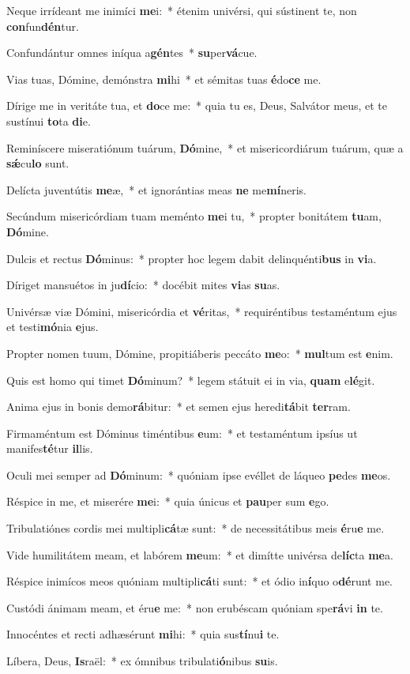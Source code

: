 \item Neque irrídeant me inimíci \textbf{me}i:~* étenim univérsi, qui sústinent te, non \textbf{con}fun\textbf{dén}tur.
\item Confundántur omnes iníqua a\textbf{gén}tes~* \textbf{su}per\textbf{vá}cue.
\item Vias tuas, Dómine, demónstra \textbf{mi}hi~* et sémitas tuas \textbf{é}do\textbf{ce} me.
\item Dírige me in veritáte tua, et \textbf{do}ce me:~* quia tu es, Deus, Salvátor meus, et te sustínui \textbf{to}ta \textbf{di}e.
\item Reminíscere miseratiónum tuárum, \textbf{Dó}mine,~* et misericordiárum tuárum, quæ a \textbf{sǽ}cu\textbf{lo} sunt.
\item Delícta juventútis \textbf{me}æ,~* et ignorántias meas \textbf{ne} me\textbf{mí}neris.
\item Secúndum misericórdiam tuam meménto \textbf{me}i tu,~* propter bonitátem \textbf{tu}am, \textbf{Dó}mine.
\item Dulcis et rectus \textbf{Dó}minus:~* propter hoc legem dabit delinquénti\textbf{bus} in \textbf{vi}a.
\item Díriget mansuétos in ju\textbf{dí}cio:~* docébit mites \textbf{vi}as \textbf{su}as.
\item Univérsæ viæ Dómini, misericórdia et \textbf{vé}ritas,~* requiréntibus testaméntum ejus et testi\textbf{mó}nia \textbf{e}jus.
\item Propter nomen tuum, Dómine, propitiáberis peccáto \textbf{me}o:~* \textbf{mul}tum est \textbf{e}nim.
\item Quis est homo qui timet \textbf{Dó}minum?~* legem státuit ei in via, \textbf{quam} e\textbf{lé}git.
\item Anima ejus in bonis demo\textbf{rá}bitur:~* et semen ejus heredi\textbf{tá}bit \textbf{ter}ram.
\item Firmaméntum est Dóminus timéntibus \textbf{e}um:~* et testaméntum ipsíus ut manifes\textbf{té}tur \textbf{il}lis.
\item Oculi mei semper ad \textbf{Dó}minum:~* quóniam ipse evéllet de láqueo \textbf{pe}des \textbf{me}os.
\item Réspice in me, et miserére \textbf{me}i:~* quia únicus et \textbf{pau}per sum \textbf{e}go.
\item Tribulatiónes cordis mei multipli\textbf{cá}tæ sunt:~* de necessitátibus meis \textbf{é}ru\textbf{e} me.
\item Vide humilitátem meam, et labórem \textbf{me}um:~* et dimítte univérsa de\textbf{líc}ta \textbf{me}a.
\item Réspice inimícos meos quóniam multipli\textbf{cá}ti sunt:~* et ódio in\textbf{í}quo o\textbf{dé}runt me.
\item Custódi ánimam meam, et éru\textbf{e} me:~* non erubéscam quóniam spe\textbf{rá}vi \textbf{in} te.
\item Innocéntes et recti adhæsérunt \textbf{mi}hi:~* quia sus\textbf{tí}nu\textbf{i} te.
\item Líbera, Deus, \textbf{Is}raël:~* ex ómnibus tribulati\textbf{ó}nibus \textbf{su}is.
